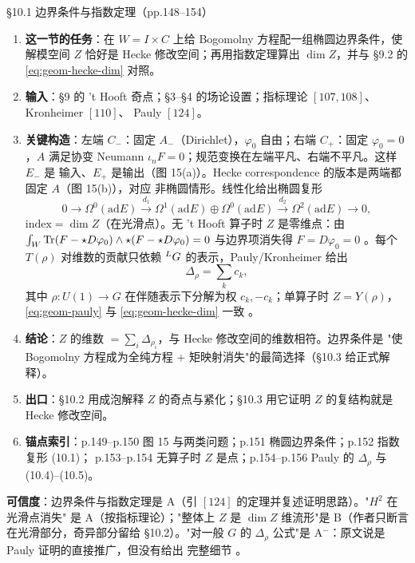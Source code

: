\begin{kcard}{\S10.1 边界条件与指数定理（pp.148--154）}
\begin{enumerate}[label=\textbf{\arabic*}]
\item \textbf{这一节的任务}：在 $W=I\times C$ 上给 Bogomolny 方程配一组椭圆边界条件，使解模空间
  $Z$ 恰好是 Hecke 修改空间；再用指数定理算出 $\dim Z$，并与 \S9.2 的 \eqref{eq:geom-hecke-dim} 对照。
\item \textbf{输入}：\S9 的 't Hooft 奇点；\S3--\S4 的场论设置；指标理论 $[107,108]$、Kronheimer $[110]$、
  Pauly $[124]$。
\item \textbf{关键构造}：左端 $C_-$：固定 $A_-$（Dirichlet），$\varphi_0$ 自由；右端 $C_+$：固定
  $\varphi_0=0$，$A$ 满足协变 Neumann $\iota_nF=0$；规范变换在左端平凡、右端不平凡。这样 $E_-$ 是
  输入、$E_+$ 是输出（图 15(a)）。Hecke correspondence 的版本是两端都固定 $A$（图 15(b)），对应
  非椭圆情形。线性化给出椭圆复形
\begin{equation}
0\to\Omega^0(\mathrm{ad}E)\xrightarrow{d_1}\Omega^1(\mathrm{ad}E)\oplus\Omega^0(\mathrm{ad}E)
\xrightarrow{d_2}\Omega^2(\mathrm{ad}E)\to0,
\label{eq:geom-elliptic}
\end{equation}
  $\text{index}=\dim Z$（在光滑点）。无 't Hooft 算子时 $Z$ 是零维点：由
  $\int_W\operatorname{Tr}(F-\star D\varphi_0)\wedge\star(F-\star D\varphi_0)=0$ 与边界项消失得
  $F=D\varphi_0=0$ \pA{}。每个 $T(\rho)$ 对维数的贡献只依赖
  ${}^{L}G$ 的表示，Pauly/Kronheimer 给出
\begin{equation}
\Delta_\rho=\sum_kc_k,
\label{eq:geom-pauly}
\end{equation}
  其中 $\rho:U(1)\to G$ 在伴随表示下分解为权 $c_k,-c_k$；单算子时 $Z=Y(\rho)$，\eqref{eq:geom-pauly}
  与 \eqref{eq:geom-hecke-dim} 一致 \pA{}。
\item \textbf{结论}：$Z$ 的维数 $=\sum_i\Delta_{\rho_i}$，与 Hecke 修改空间的维数相符。边界条件是
  "使 Bogomolny 方程成为全纯方程 $+$ 矩映射消失"的最简选择（\S10.3 给正式解释）。
\item \textbf{出口}：\S10.2 用成泡解释 $Z$ 的奇点与紧化；\S10.3 用它证明 $Z$ 的复结构就是 Hecke
  修改空间。
\item \textbf{锚点索引}：p.149--p.150 图 15 与两类问题；p.151 椭圆边界条件；p.152 指数复形 (10.1)；
  p.153--p.154 无算子时 $Z$ 是点；p.154--p.156 Pauly 的 $\Delta_\rho$ 与 (10.4)--(10.5)。
\end{enumerate}
\textbf{可信度}：边界条件与指数定理是 A（引 $[124]$ 的定理并复述证明思路）。"$H^2$ 在光滑点消失"
是 A（按指标理论）；"整体上 $Z$ 是 $\dim Z$ 维流形"是 B（作者只断言在光滑部分，奇异部分留给
\S10.2）。"对一般 $G$ 的 $\Delta_\rho$ 公式"是 A$^-$：原文说是 Pauly 证明的直接推广，但没有给出
完整细节 \pB{}。
\end{kcard}

